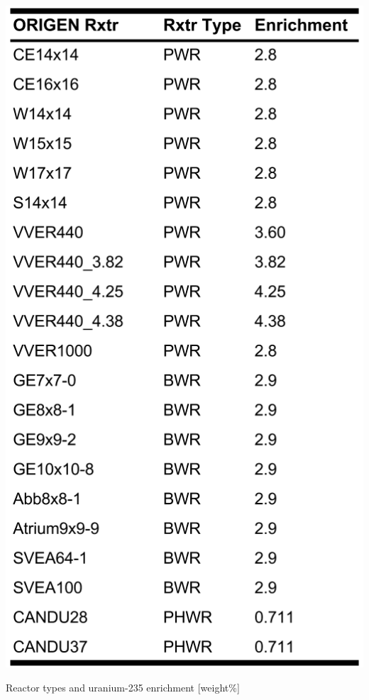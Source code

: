 \begin{table}[!hp]
  \centering
  \begin{subtable}{\linewidth}
    \centering
    \includegraphics[height=0.7\textheight]{./chapters/method/TrainData.png}
    \caption{Reactor types and uranium-235 enrichment [weight\%]}
    \label{tbl:rxtrtype}
    \vspace*{5mm}
  \end{subtable}

\end{table}
